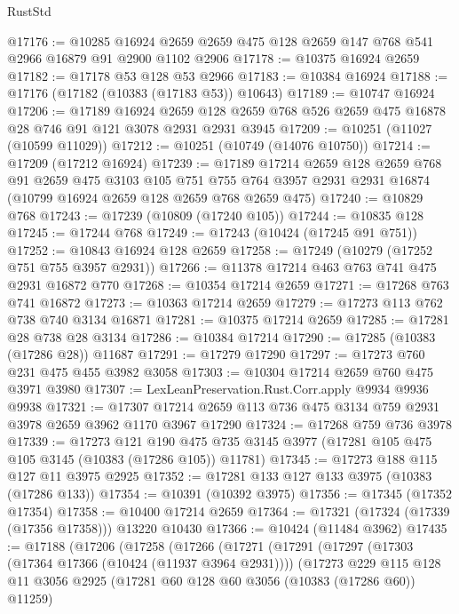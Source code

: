 \begin{lexlean}{RustStd}
\begin{coremodule}
@17176 := @10285
    @16924
    @2659
    @2659
    @475
    @128
    @2659
    @147
    @768
    @541
    @2966
    @16879
    @91
    @2900
    @1102
    @2906
@17178 := @10375 @16924 @2659
@17182 := @17178 @53 @128 @53 @2966
@17183 := @10384 @16924
@17188 := @17176 (@17182 (@10383 (@17183 @53)) @10643)
@17189 := @10747 @16924
@17206 := @17189
    @16924
    @2659
    @128
    @2659
    @768
    @526
    @2659
    @475
    @16878
    @28
    @746
    @91
    @121
    @3078
    @2931
    @2931
    @3945
@17209 := @10251 (@11027 (@10599 @11029))
@17212 := @10251 (@10749 (@14076 @10750))
@17214 := @17209 (@17212 @16924)
@17239 := @17189
    @17214
    @2659
    @128
    @2659
    @768
    @91
    @2659
    @475
    @3103
    @105
    @751
    @755
    @764
    @3957
    @2931
    @2931
    @16874
    (@10799 @16924 @2659 @128 @2659 @768 @2659 @475)
@17240 := @10829 @768
@17243 := @17239 (@10809 (@17240 @105))
@17244 := @10835 @128
@17245 := @17244 @768
@17249 := @17243 (@10424 (@17245 @91 @751))
@17252 := @10843 @16924 @128 @2659
@17258 := @17249 (@10279 (@17252 @751 @755 @3957 @2931))
@17266 := @11378 @17214 @463 @763 @741 @475 @2931 @16872 @770
@17268 := @10354 @17214 @2659
@17271 := @17268 @763 @741 @16872
@17273 := @10363 @17214 @2659
@17279 := @17273 @113 @762 @738 @740 @3134 @16871
@17281 := @10375 @17214 @2659
@17285 := @17281 @28 @738 @28 @3134
@17286 := @10384 @17214
@17290 := @17285 (@10383 (@17286 @28)) @11687
@17291 := @17279 @17290
@17297 := @17273 @760 @231 @475 @455 @3982 @3058
@17303 := @10304 @17214 @2659 @760 @475 @3971 @3980
@17307 := LexLeanPreservation.Rust.Corr.apply @9934 @9936 @9938
@17321 := @17307 @17214 @2659 @113 @736 @475 @3134 @759 @2931 @3978 @2659 @3962 @1170 @3967 @17290
@17324 := @17268 @759 @736 @3978
@17339 := @17273
    @121
    @190
    @475
    @735
    @3145
    @3977
    (@17281 @105 @475 @105 @3145 (@10383 (@17286 @105)) @11781)
@17345 := @17273 @188 @115 @127 @11 @3975 @2925
@17352 := @17281 @133 @127 @133 @3975 (@10383 (@17286 @133))
@17354 := @10391 (@10392 @3975)
@17356 := @17345 (@17352 @17354)
@17358 := @10400 @17214 @2659
@17364 := @17321 (@17324 (@17339 (@17356 @17358))) @13220 @10430
@17366 := @10424 (@11484 @3962)
@17435 := @17188
    (@17206
      (@17258
        (@17266
          (@17271
            (@17291
              (@17297
                (@17303 (@17364 @17366 (@10424 (@11937 @3964 @2931))))
                (@17273
                  @229
                  @115
                  @128
                  @11
                  @3056
                  @2925
                  (@17281 @60 @128 @60 @3056 (@10383 (@17286 @60)) @11259)

\end{coremodule}
\end{lexlean}
